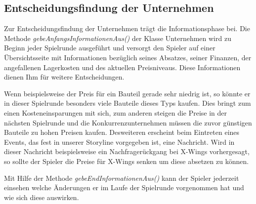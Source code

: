 \subsection{Entscheidungsfindung der Unternehmen}
\label{sub:fachkonzept-implementierung-entscheidungsfindung}


Zur Entscheidungsfindung der Unternehmen trägt die Informationsphase bei. Die Methode \textit{gebeAnfangsInformationenAus()}
der Klasse Unternehmen wird zu Beginn jeder Spielrunde ausgeführt und versorgt den Spieler auf einer Übersichtsseite
mit Informationen bezüglich seines Absatzes, seiner Finanzen, der angefallenen Lagerkosten und des aktuellen Preisniveaus.
Diese Informationen dienen Ihm für weitere Entscheidungen.

Wenn beispielsweise der Preis für ein Bauteil gerade sehr niedrig ist, so könnte er in dieser Spielrunde besonders viele
Bauteile dieses Typs kaufen. Dies bringt zum einen Kosteneinsparungen mit sich, zum anderen steigen die Preise in der nächsten
Spielrunde und die Konkurrenzunternehmen müssen die zuvor günstigen Bauteile zu hohen Preisen kaufen. Desweiteren erscheint
beim Eintreten eines Events, das fest in unserer Storyline vorgegeben ist, eine Nachricht. Wird in dieser Nachricht
beispielsweise ein Nachfragerückgang bei X-Wings vorhergesagt, so sollte der Spieler die Preise für X-Wings senken
um diese absetzen zu können.

Mit Hilfe der Methode \textit{gebeEndInformationenAus()} kann der Spieler jederzeit einsehen welche Änderungen er im Laufe der
Spielrunde vorgenommen hat und wie sich diese auswirken.